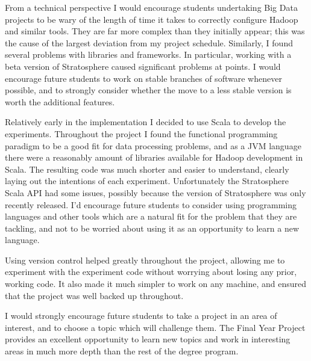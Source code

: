 From a technical perspective I would encourage students undertaking Big Data projects to be wary of the length of time it takes to correctly configure Hadoop and similar tools. They are far more complex than they initially appear; this was the cause of the largest deviation from my project schedule. Similarly, I found several problems with libraries and frameworks. In particular, working with a beta version of Stratosphere caused significant problems at points. I would encourage future students to work on stable branches of software whenever possible, and to strongly consider whether the move to a less stable version is worth the additional features.

Relatively early in the implementation I decided to use Scala to develop the experiments. Throughout the project I found the functional programming paradigm to be a good fit for data processing problems, and as a JVM language there were a reasonably amount of libraries available for Hadoop development in Scala. The resulting code was much shorter and easier to understand, clearly laying out the intentions of each experiment. Unfortunately the Stratosphere Scala API had some issues, possibly because the version of Stratosphere was only recently released. I'd encourage future students to consider using programming languages and other tools which are a natural fit for the problem that they are tackling, and not to be worried about using it as an opportunity to learn a new language. 

Using version control helped greatly throughout the project, allowing me to experiment with the experiment code without worrying about losing any prior, working code. It also made it much simpler to work on any machine, and ensured that the project was well backed up throughout. 

I would strongly encourage future students to take a project in an area of interest, and to choose a topic which will challenge them. The Final Year Project provides an excellent opportunity to learn new topics and work in interesting areas in much more depth than the rest of the degree program.